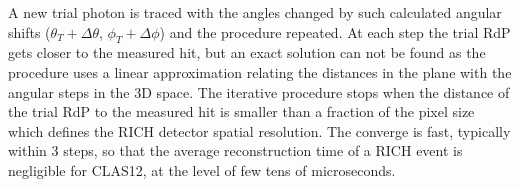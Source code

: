  A new trial photon is traced with the angles changed by such calculated angular shifts ($\theta_T + \Delta \theta$, $\phi_T + \Delta \phi$) and the procedure repeated. At each step the trial RdP gets closer to the measured hit, but an exact solution can not be found as the procedure uses a linear approximation relating the distances in the \MaPMT plane with the angular steps in the 3D space. The iterative procedure stops when the distance of the trial RdP to the measured hit is smaller than a fraction of the \MaPMT pixel size which defines the RICH detector spatial resolution. The converge is fast, typically within 3 steps, so that the average reconstruction time of a RICH event is negligible for CLAS12, at the level of few tens of microseconds.


